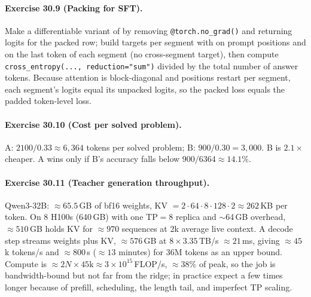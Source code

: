 \paragraph{Exercise 30.9 (Packing for SFT).}
Make a differentiable variant of  by removing \texttt{@torch.no\_grad()} and
returning logits for the packed row; build targets per segment with  on prompt
positions and on the last token of each segment (no cross-segment target), then compute
\texttt{cross\_entropy(..., reduction="sum")} divided by the total number of answer tokens. Because
attention is block-diagonal and positions restart per segment, each segment's logits equal its
unpacked logits, so the packed loss equals the padded token-level loss.

\paragraph{Exercise 30.10 (Cost per solved problem).}
A: $2100/0.33\approx6{,}364$ tokens per solved problem; B: $900/0.30=3{,}000$. B is $2.1\times$
cheaper. A wins only if B's accuracy falls below $900/6364\approx14.1\%$.

\paragraph{Exercise 30.11 (Teacher generation throughput).}
Qwen3-32B: $\approx65.5$\,GB of bf16 weights, KV $=2\cdot64\cdot8\cdot128\cdot2\approx262$\,KB per
token. On 8 H100s (640\,GB) with one TP$=8$ replica and $\sim$64\,GB overhead, $\approx510$\,GB holds KV
for $\approx970$ sequences at 2k average live context. A decode step streams weights plus KV,
$\approx576$\,GB at $8\times3.35$\,TB/s $\approx21$\,ms, giving $\approx45$k tokens/s and
$\approx 800$\,s ($\approx13$ minutes) for 36M tokens as an upper bound. Compute is $\approx2N\times45\text{k}
\approx3\times10^{15}$\,FLOP/s, $\approx38\%$ of peak, so the job is bandwidth-bound but not far from
the ridge; in practice expect a few times longer because of prefill, scheduling, the length tail,
and imperfect TP scaling.
